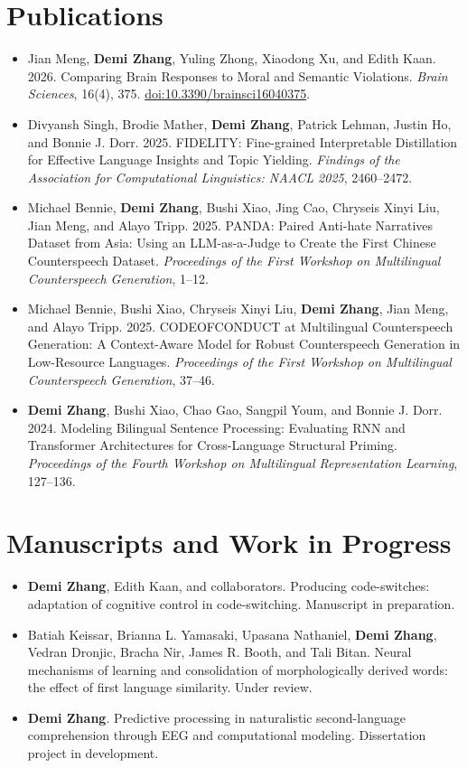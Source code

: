 \documentclass[11pt,letterpaper]{article}
\begin{document}
\section*{Publications}
\begin{itemize}
\item Jian Meng, \textbf{Demi Zhang}, Yuling Zhong, Xiaodong Xu, and Edith Kaan. 2026. Comparing Brain Responses to Moral and Semantic Violations. \textit{Brain Sciences}, 16(4), 375. \href{https://doi.org/10.3390/brainsci16040375}{doi:10.3390/brainsci16040375}.
\item Divyansh Singh, Brodie Mather, \textbf{Demi Zhang}, Patrick Lehman, Justin Ho, and Bonnie J. Dorr. 2025. FIDELITY: Fine-grained Interpretable Distillation for Effective Language Insights and Topic Yielding. \textit{Findings of the Association for Computational Linguistics: NAACL 2025}, 2460--2472.
\item Michael Bennie, \textbf{Demi Zhang}, Bushi Xiao, Jing Cao, Chryseis Xinyi Liu, Jian Meng, and Alayo Tripp. 2025. PANDA: Paired Anti-hate Narratives Dataset from Asia: Using an LLM-as-a-Judge to Create the First Chinese Counterspeech Dataset. \textit{Proceedings of the First Workshop on Multilingual Counterspeech Generation}, 1--12.
\item Michael Bennie, Bushi Xiao, Chryseis Xinyi Liu, \textbf{Demi Zhang}, Jian Meng, and Alayo Tripp. 2025. CODEOFCONDUCT at Multilingual Counterspeech Generation: A Context-Aware Model for Robust Counterspeech Generation in Low-Resource Languages. \textit{Proceedings of the First Workshop on Multilingual Counterspeech Generation}, 37--46.
\item \textbf{Demi Zhang}, Bushi Xiao, Chao Gao, Sangpil Youm, and Bonnie J. Dorr. 2024. Modeling Bilingual Sentence Processing: Evaluating RNN and Transformer Architectures for Cross-Language Structural Priming. \textit{Proceedings of the Fourth Workshop on Multilingual Representation Learning}, 127--136.
\end{itemize}

\section*{Manuscripts and Work in Progress}
\begin{itemize}
\item \textbf{Demi Zhang}, Edith Kaan, and collaborators. Producing code-switches: adaptation of cognitive control in code-switching. Manuscript in preparation.
\item Batiah Keissar, Brianna L. Yamasaki, Upasana Nathaniel, \textbf{Demi Zhang}, Vedran Dronjic, Bracha Nir, James R. Booth, and Tali Bitan. Neural mechanisms of learning and consolidation of morphologically derived words: the effect of first language similarity. Under review.
\item \textbf{Demi Zhang}. Predictive processing in naturalistic second-language comprehension through EEG and computational modeling. Dissertation project in development.
\end{itemize}
\end{document}
